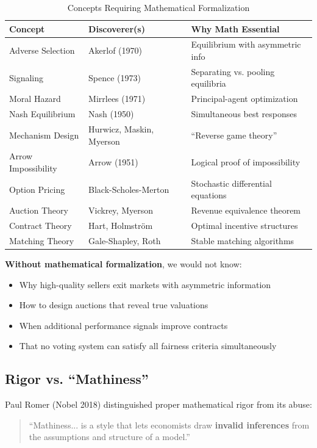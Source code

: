 \documentclass[12pt,a4paper]{article}
\begin{document}
\begin{table}[H]
\centering
\caption{Concepts Requiring Mathematical Formalization}
\label{tab:formalization-required}
\renewcommand{\arraystretch}{1.3}
\small
\begin{tabular}{@{}lll@{}}
\toprule
\textbf{Concept} & \textbf{Discoverer(s)} & \textbf{Why Math Essential} \\
\midrule
Adverse Selection & Akerlof (1970) & Equilibrium with asymmetric info \\
Signaling & Spence (1973) & Separating vs. pooling equilibria \\
Moral Hazard & Mirrlees (1971) & Principal-agent optimization \\
Nash Equilibrium & Nash (1950) & Simultaneous best responses \\
Mechanism Design & Hurwicz, Maskin, Myerson & ``Reverse game theory'' \\
Arrow Impossibility & Arrow (1951) & Logical proof of impossibility \\
Option Pricing & Black-Scholes-Merton & Stochastic differential equations \\
Auction Theory & Vickrey, Myerson & Revenue equivalence theorem \\
Contract Theory & Hart, Holmstr\"{o}m & Optimal incentive structures \\
Matching Theory & Gale-Shapley, Roth & Stable matching algorithms \\
\bottomrule
\end{tabular}
\end{table}

\textbf{Without mathematical formalization}, we would not know:
\begin{itemize}[nosep]
\item Why high-quality sellers exit markets with asymmetric information
\item How to design auctions that reveal true valuations
\item When additional performance signals improve contracts
\item That no voting system can satisfy all fairness criteria simultaneously
\end{itemize}

\subsection{Rigor vs. ``Mathiness''}

Paul Romer (Nobel 2018) distinguished proper mathematical rigor from its abuse:
\begin{quote}
``Mathiness... is a style that lets economists draw \textbf{invalid inferences} from the assumptions and structure of a model.''
\end{quote}
\end{document}
